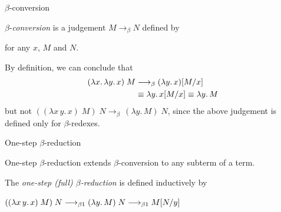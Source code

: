 \begin{frame}{$\beta$-conversion}
\begin{definition}
  $\beta$-\emph{conversion} is a judgement $M \longrightarrow_\beta N$ defined by
  \begin{prooftree}
  \end{prooftree}
  for any $x$, $M$ and $N$.
\end{definition}

By definition, we can conclude that 
  \begin{align*}
    (\lambda x.\,\lambda y.\,x)\;M
    & \longrightarrow_{\beta}
    (\lambda y.\, x)\subst{M}{x} \\
    & \equiv \lambda y.\, x\subst{M}{x} \equiv \lambda y.\, M \\
  \end{align*}
  but not $((\lambda x\, y.\, x)\; M)\;N \longrightarrow_{\beta} \, (\lambda
  y.\, M)\;N$,
  since the above judgement is defined only for \alert{$\beta$-redexes}.
\end{frame}

\begin{frame}{One-step $\beta$-reduction}

One-step $\beta$-reduction extends $\beta$-conversion to any subterm of a
term.  

\begin{definition}
  The \emph{one-step (full) $\beta$-reduction} is defined inductively by
  \begin{multicols}{2}
    \begin{prooftree}
    \end{prooftree}
    \begin{prooftree}
    \end{prooftree}
    \begin{prooftree}
    \end{prooftree}
    \begin{prooftree}
    \end{prooftree}
  \end{multicols}
\end{definition}
    $((\lambda x\, y.\, x)\; M)\;N \onereduce (\lambda y.\, M)\;N \onereduce M\subst{N}{y}$
\end{frame}

